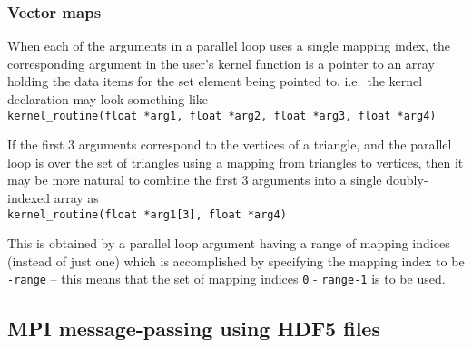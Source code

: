 \documentclass[11pt]{article}
\begin{document}
\subsubsection{Vector maps}

When each of the arguments in a parallel loop uses a single
mapping index, the corresponding argument in the user's kernel
function is a pointer to an array holding the data items for
the set element being pointed to. i.e.~the kernel declaration
may look something like\\
{\tt kernel\_routine(float *arg1, float *arg2, float *arg3, float *arg4)}

If the first 3 arguments correspond to the vertices of a triangle,
and the parallel loop is over the set of triangles using a mapping
from triangles to vertices, then it may be more natural to combine
the first 3 arguments into a single doubly-indexed array as\\
{\tt kernel\_routine(float *arg1[3], float *arg4)}

This is obtained by a parallel loop argument having a range of mapping
indices (instead of just one) which is accomplished by specifying the
mapping index to be {\tt -range} -- this means that the set of mapping
indices {\tt 0} - {\tt range-1} is to be used.

\newpage

\subsection{MPI message-passing using HDF5 files}
\subsubsection*{}
\subsubsection*{}
\end{document}
